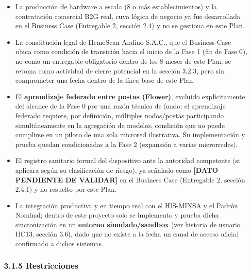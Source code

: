 \documentclass[11pt,a4paper]{article}
\providecommand{\tightlist}{%
  \setlength{\itemsep}{0pt}\setlength{\parskip}{0pt}}
\begin{document}
\begin{itemize}
\tightlist
\item
  La producción de hardware a escala (8 o más establecimientos) y la contratación comercial B2G real, cuya lógica de negocio ya fue desarrollada en el Business Case (Entregable 2, sección 2.4) y no se gestiona en este Plan.
\item
  La constitución legal de HemoScan Andino S.A.C., que el Business Case ubica como condición de transición hacia el inicio de la Fase 1 (fin de Fase 0), no como un entregable obligatorio dentro de los 8 meses de este Plan; se retoma como actividad de cierre potencial en la sección 3.2.3, pero sin comprometer una fecha dentro de la línea base de este Plan.
\item
  El \textbf{aprendizaje federado entre postas (Flower)}, excluido explícitamente del alcance de la Fase 0 por una razón técnica de fondo: el aprendizaje federado requiere, por definición, múltiples nodos/postas participando simultáneamente en la agregación de modelos, condición que no puede cumplirse en un piloto de una sola microred ilustrativa. Su implementación y prueba quedan condicionadas a la Fase 2 (expansión a varias microrredes).
\item
  El registro sanitario formal del dispositivo ante la autoridad competente (si aplicara según su clasificación de riesgo), ya señalado como \textbf{{[}DATO PENDIENTE DE VALIDAR{]}} en el Business Case (Entregable 2, sección 2.4.1) y no resuelto por este Plan.
\item
  La integración productiva y en tiempo real con el HIS-MINSA y el Padrón Nominal; dentro de este proyecto solo se implementa y prueba dicha sincronización en un \textbf{entorno simulado/sandbox} (ver historia de usuario HC13, sección 3.6), dado que no existe a la fecha un canal de acceso oficial confirmado a dichos sistemas.
\end{itemize}

\subsubsection{3.1.5 Restricciones}\label{restricciones}
\end{document}
